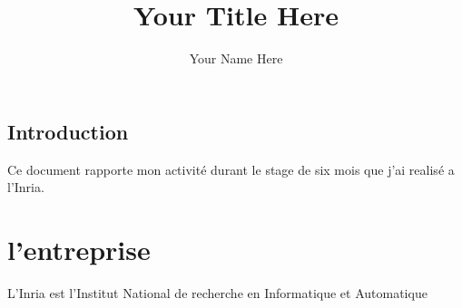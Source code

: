 \documentclass{report}
\author{Your Name Here}
\title{Your Title Here}
\begin{document}
\maketitle
\tableofcontents


\section{Introduction}
Ce document rapporte mon activité durant le stage de six mois que j'ai 
realisé a l'Inria.

\chapter{l'entreprise}

L'Inria est l'Institut National de recherche en Informatique et Automatique
\end{document}
